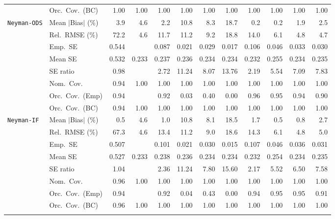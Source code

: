 \begin{landscape}
\begin{longtable}{llrrrrrrrrrr}
 & Orc.\ Cov.\ (BC) & \cellcolor{ranktwo}1.00 & \cellcolor{rankthree}1.00 & 1.00 & 1.00 & 1.00 & 1.00 & \cellcolor{rankone}1.00 & 1.00 & 1.00 & 1.00 \\
\addlinespace[2pt]
\quad \texttt{Neyman-ODS} & Mean $|$Bias$|$ (\%) & 3.9 & 4.6 & 2.2 & 10.8 & 8.3 & 18.7 & \cellcolor{ranktwo}0.2 & \cellcolor{rankone}0.2 & \cellcolor{rankthree}1.9 & 2.5 \\
 & Rel.\ RMSE (\%) & 72.2 & \cellcolor{rankone}4.6 & 11.7 & 11.2 & 9.2 & 18.8 & 14.0 & 6.1 & \cellcolor{rankthree}4.8 & \cellcolor{ranktwo}4.7 \\
 & Emp.\ SE & 0.544 &  & 0.087 & 0.021 & 0.029 & 0.017 & 0.106 & 0.046 & 0.033 & 0.030 \\
 & Mean SE & 0.532 & 0.233 & 0.237 & 0.236 & 0.234 & 0.234 & 0.232 & 0.255 & 0.234 & 0.235 \\
 & SE ratio & \cellcolor{rankone}0.98 &  & \cellcolor{rankthree}2.72 & 11.24 & 8.07 & 13.76 & \cellcolor{ranktwo}2.19 & 5.54 & 7.09 & 7.83 \\
 & Nom.\ Cov. & \cellcolor{rankone}0.94 & \cellcolor{rankthree}1.00 & 1.00 & 1.00 & 1.00 & 1.00 & \cellcolor{ranktwo}1.00 & 1.00 & 1.00 & 1.00 \\
 & Orc.\ Cov.\ (Emp) & 0.94 &  & 0.92 & 0.03 & 0.40 & 0.00 & \cellcolor{ranktwo}0.96 & \cellcolor{rankone}0.95 & \cellcolor{rankthree}0.94 & 0.90 \\
 & Orc.\ Cov.\ (BC) & \cellcolor{rankone}0.94 & \cellcolor{rankthree}1.00 & 1.00 & 1.00 & 1.00 & 1.00 & \cellcolor{ranktwo}1.00 & 1.00 & 1.00 & 1.00 \\
\addlinespace[2pt]
\quad \texttt{Neyman-IF} & Mean $|$Bias$|$ (\%) & \cellcolor{rankone}0.5 & 4.6 & 1.0 & 10.8 & 8.1 & 18.5 & 1.7 & \cellcolor{ranktwo}0.5 & \cellcolor{rankthree}0.8 & 2.7 \\
 & Rel.\ RMSE (\%) & 67.3 & \cellcolor{rankone}4.6 & 13.4 & 11.2 & 9.0 & 18.6 & 14.3 & 6.1 & \cellcolor{ranktwo}4.8 & \cellcolor{rankthree}5.0 \\
 & Emp.\ SE & 0.507 &  & 0.101 & 0.021 & 0.030 & 0.015 & 0.107 & 0.046 & 0.036 & 0.031 \\
 & Mean SE & 0.527 & 0.233 & 0.238 & 0.236 & 0.234 & 0.234 & 0.232 & 0.254 & 0.234 & 0.235 \\
 & SE ratio & \cellcolor{rankone}1.04 &  & \cellcolor{rankthree}2.36 & 11.24 & 7.80 & 15.60 & \cellcolor{ranktwo}2.17 & 5.52 & 6.50 & 7.58 \\
 & Nom.\ Cov. & \cellcolor{rankone}0.96 & \cellcolor{ranktwo}1.00 & \cellcolor{rankthree}1.00 & 1.00 & 1.00 & 1.00 & 1.00 & 1.00 & 1.00 & 1.00 \\
 & Orc.\ Cov.\ (Emp) & \cellcolor{rankthree}0.94 &  & 0.92 & 0.04 & 0.43 & 0.00 & 0.94 & \cellcolor{ranktwo}0.95 & \cellcolor{rankone}0.95 & 0.91 \\
 & Orc.\ Cov.\ (BC) & \cellcolor{rankone}0.96 & \cellcolor{rankthree}1.00 & 1.00 & 1.00 & 1.00 & 1.00 & \cellcolor{ranktwo}1.00 & 1.00 & 1.00 & 1.00 \\
\addlinespace[2pt]
\end{longtable}
\end{landscape}
